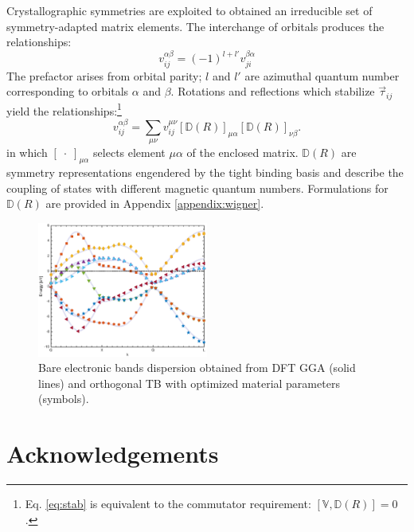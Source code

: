 \documentclass[twocolumn,showpacs,preprintnumbers,superscriptaddress,prb,floatfix,aps,10pt]{revtex4-1}
\newcommand*{\wignerD}{\mathbb{D}(R)}
\newcommand*{\bondvec}{\vec{\tau}_{ij}}
\begin{document}
Crystallographic symmetries are exploited to obtained an irreducible set of symmetry-adapted matrix elements. The interchange of orbitals produces the relationships:
%
\begin{equation}
\label{eq:intrinsic}
v_{ij}^{\alpha\beta} = (-1)^{l+l'}v_{ji}^{\beta\alpha}
\end{equation}
%
The prefactor arises from orbital parity; $l$ and $l'$ are azimuthal quantum number corresponding to orbitals $\alpha$ and $\beta$. Rotations and reflections which stabilize $\bondvec$ yield the relationships:\footnote{Eq. \ref{eq:stab} is equivalent to the commutator requirement: $[\mathbb{V},\wignerD] = 0$.}
%
\begin{equation}
\label{eq:stab}
v_{ij}^{\alpha\beta} = \sum_{\mu\nu} v_{ij}^{\mu\nu} \left[\wignerD\right]_{\mu\alpha} \left[\wignerD\right]_{\nu\beta}.
\end{equation}
%
in which $\left[\phantom{.}\cdot\phantom{.}\right]_{\mu\alpha}$ selects element $\mu\alpha$ of the enclosed matrix. $\wignerD$ are symmetry representations engendered by the tight binding basis and describe the coupling of states with different magnetic quantum numbers. Formulations for $\wignerD$ are provided in Appendix \ref{appendix:wigner}.
%








\begin{figure}
\label{fig:kappa_vs_t}
\includegraphics[width=0.5\textwidth]{band_structure.eps}
\caption{Bare electronic bands dispersion obtained from DFT GGA (solid lines) and orthogonal TB with optimized material parameters (symbols). } 
\end{figure}



\section{Acknowledgements}
\end{document}
